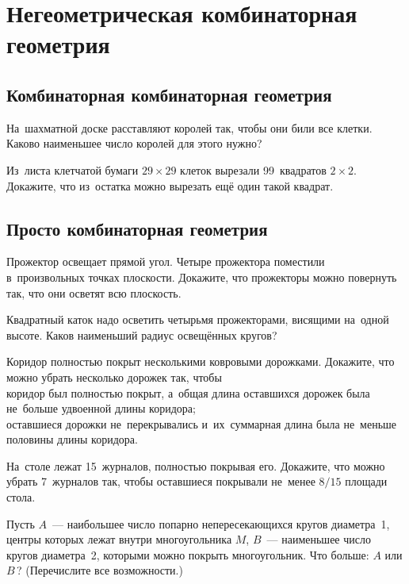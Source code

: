 

\section*{Негеометрическая комбинаторная геометрия}



\subsection*{Комбинаторная комбинаторная геометрия}

\begin{problems}

\item
На~шахматной доске расставляют королей так, чтобы они били все клетки.
Каково наименьшее число королей для этого нужно?

\item
Из~листа клетчатой бумаги $29 \times 29$ клеток вырезали 99~квадратов
$2 \times 2$.
Докажите, что из~остатка можно вырезать ещё один такой квадрат.

\end{problems}


\subsection*{Просто комбинаторная геометрия}

\begin{problems}

\item
Прожектор освещает прямой угол.
Четыре прожектора поместили в~произвольных точках плоскости.
Докажите, что прожекторы можно повернуть так, что они осветят всю плоскость.

\item
Квадратный каток надо осветить четырьмя прожекторами, висящими на~одной высоте.
Каков наименьший радиус освещённых кругов?

\item
Коридор полностью покрыт несколькими ковровыми дорожками.
Докажите, что можно убрать несколько дорожек так, чтобы
\\
\sbp
коридор был полностью покрыт, а~общая длина оставшихся дорожек была не~больше
удвоенной длины коридора;
\\
\sbp
оставшиеся дорожки не~перекрывались и~их~суммарная длина была не~меньше
половины длины коридора.

\item
На~столе лежат 15~журналов, полностью покрывая его.
Докажите, что можно убрать 7~журналов так, чтобы оставшиеся покрывали не~менее
$8 / 15$ площади стола.

\item
Пусть $A$~--- наибольшее число попарно непересекающихся кругов диаметра~1,
центры которых лежат внутри многоугольника $M$,
$B$~--- наименьшее число кругов диаметра~2, которыми можно покрыть
многоугольник.
Что больше: $A$ или $B$\,?
(Перечислите все возможности.)

\end{problems}

